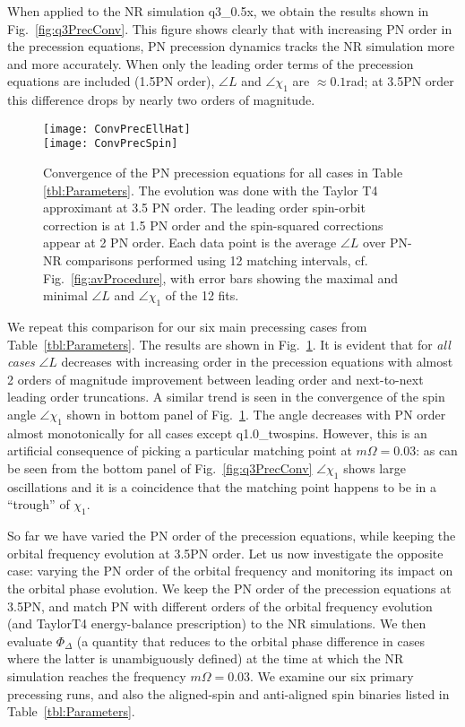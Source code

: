 \documentclass[aps,prd,amsmath,floatfix,twocolumn,superscriptaddress,nofootinbib,showpacs]{revtex4-1}
\begin{document}
When applied to the NR simulation q3\_0.5x, we obtain the results
shown in Fig.~\ref{fig:q3PrecConv}.  This figure shows clearly that
with increasing PN order in the precession equations, PN precession
dynamics tracks the NR simulation more and more accurately.  When only
the leading order terms of the precession equations are included
(1.5PN order), $\angle L$ and $\angle\chi_1$ are $\approx 0.1$rad; at
3.5PN order this difference drops by nearly two orders of magnitude.


\begin{figure}
  \centering
  \texttt{[image: ConvPrecEllHat]}\\
  \texttt{[image: ConvPrecSpin]}
  \caption{Convergence of the PN precession equations for all cases in
    Table \ref{tbl:Parameters}. The evolution was done with the Taylor
    T4 approximant at 3.5 PN order. The leading order spin-orbit
    correction is at 1.5 PN order and the spin-squared corrections
    appear at 2 PN order.  Each data point is the average $\angle L$
    over PN-NR comparisons performed using 12 matching intervals,
    cf. Fig.~\ref{fig:avProcedure}, with error bars showing the maximal
    and minimal $\angle L$ and $\angle \chi_1$ of the 12 fits.  }
  \label{fig:PrecPNOrder}
\end{figure}

We repeat this comparison for our six main precessing cases from
Table~\ref{tbl:Parameters}. The results are shown in
Fig.~\ref{fig:PrecPNOrder}. It is evident that for \emph{all cases}
$\angle L $ decreases with increasing order in the precession
equations with almost 2 orders of magnitude improvement between
leading order and next-to-next leading order truncations.  A similar
trend is seen in the convergence of the spin angle $\angle\chi_{1}$
shown in bottom panel of Fig.~\ref{fig:PrecPNOrder}. The angle
decreases with PN order almost monotonically for all cases except
q1.0\_twospins.  However, this is an artificial consequence of picking
a particular matching point at $m\Omega=0.03$: as can be seen from the
bottom panel of Fig.~\ref{fig:q3PrecConv} $\angle \chi_{1}$ shows
large oscillations and it is a coincidence that the matching point
happens to be in a ``trough'' of $\chi_{1}$.



So far we have varied the PN order of the precession equations, while
keeping the orbital frequency evolution at 3.5PN order.  Let us now
investigate the opposite case: varying the PN order of the orbital
frequency and monitoring its impact on the orbital phase evolution.
We keep the PN order of the precession equations at 3.5PN, and match
PN with different orders of the orbital frequency evolution (and
TaylorT4 energy-balance prescription) to the NR simulations.  We then
evaluate $\Phi_\Delta$ (a quantity that reduces to the orbital phase
difference in cases where the latter is unambiguously defined) at the
time at which the NR simulation reaches the frequency $m\Omega=0.03$.
We examine our six primary  precessing runs,
and also the aligned-spin and anti-aligned spin binaries listed in
Table~\ref{tbl:Parameters}.
\end{document}
